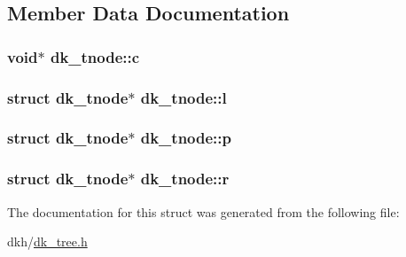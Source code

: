\subsection{Member Data Documentation}
\hypertarget{structdk__tnode_a4d8427a1419ca15308105dae0621c2bf}{
\subsubsection[{c}]{\setlength{\rightskip}{0pt plus 5cm}void$\ast$ dk\+\_\+tnode\+::c}}\label{structdk__tnode_a4d8427a1419ca15308105dae0621c2bf}
\hypertarget{structdk__tnode_acf718a20eaecd8c363ef2f70742013a5}{
\subsubsection[{l}]{\setlength{\rightskip}{0pt plus 5cm}struct {\bf dk\+\_\+tnode}$\ast$ dk\+\_\+tnode\+::l}}\label{structdk__tnode_acf718a20eaecd8c363ef2f70742013a5}
\hypertarget{structdk__tnode_a3a3fdb7d00634c393fad557eb15f0166}{
\subsubsection[{p}]{\setlength{\rightskip}{0pt plus 5cm}struct {\bf dk\+\_\+tnode}$\ast$ dk\+\_\+tnode\+::p}}\label{structdk__tnode_a3a3fdb7d00634c393fad557eb15f0166}
\hypertarget{structdk__tnode_a13392f297542ba6ec06da4e389ef3d7f}{
\subsubsection[{r}]{\setlength{\rightskip}{0pt plus 5cm}struct {\bf dk\+\_\+tnode}$\ast$ dk\+\_\+tnode\+::r}}\label{structdk__tnode_a13392f297542ba6ec06da4e389ef3d7f}


The documentation for this struct was generated from the following file\+:\begin{DoxyCompactItemize}
\item 
dkh/\hyperlink{dk__tree_8h}{dk\+\_\+tree.\+h}\end{DoxyCompactItemize}
